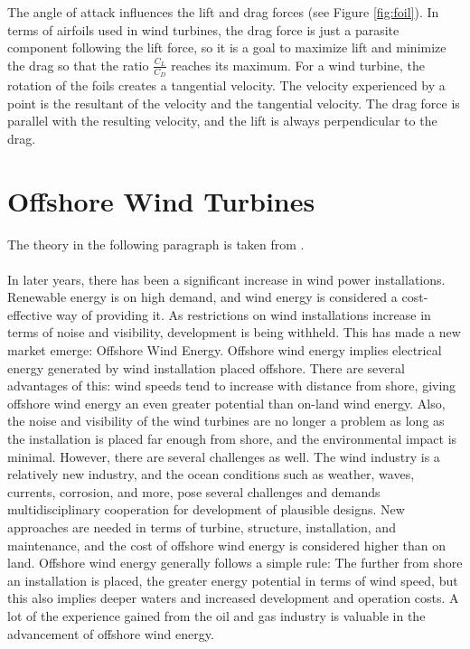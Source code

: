 \noindent The angle of attack influences the lift and drag forces (see Figure \ref{fig:foil}). In terms of airfoils used in wind turbines, the drag force is just a parasite component following the lift force, so it is a goal to maximize lift and minimize the drag so that the ratio $\frac{C_L}{C_D}$ reaches its maximum. For a wind turbine, the rotation of the foils creates a tangential velocity. The velocity experienced by a point is the resultant of the velocity and the tangential velocity. The drag force is parallel with the resulting velocity, and the lift is always perpendicular to the drag. 

\section{Offshore Wind Turbines}
The theory in the following paragraph is taken from \cite{Kapsali2012}.\\\\ In later years, there has been a significant increase in wind power installations. Renewable energy is on high demand, and wind energy is considered a cost-effective way of providing it. As restrictions on wind installations increase in terms of noise and visibility, development is being withheld. This has made a new market emerge: Offshore Wind Energy. Offshore wind energy implies electrical energy generated by wind installation placed offshore.  There are several advantages of this: wind speeds tend to increase with distance from shore, giving offshore wind energy an even greater potential than on-land wind energy. Also, the noise and visibility of the wind turbines are no longer a problem as long as the installation is placed far enough from shore, and the environmental impact is minimal. However, there are several challenges as well. The wind industry is a relatively new industry, and the ocean conditions such as weather, waves, currents, corrosion, and more, pose several challenges and demands multidisciplinary cooperation for development of plausible designs. New approaches are needed in terms of turbine, structure, installation, and maintenance, and the cost of offshore wind energy is considered higher than on land. Offshore wind energy generally follows a simple rule: The further from shore an installation is placed, the greater energy potential in terms of wind speed, but this also implies deeper waters and increased development and operation costs. A lot of the experience gained from the oil and gas industry is valuable in the advancement of offshore wind energy. 

